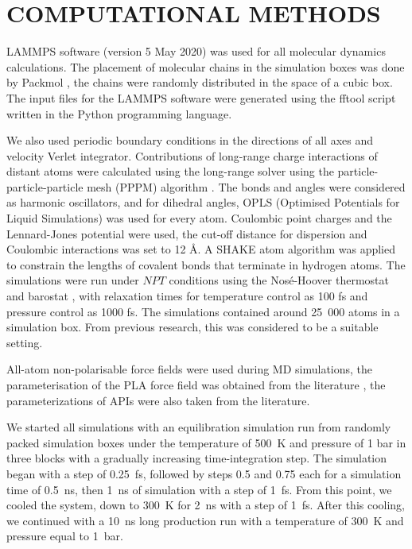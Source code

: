 \newpage
\section{COMPUTATIONAL METHODS}


LAMMPS software \cite{thompson_lammps_2022} (version 5 May 2020) was used for all molecular dynamics calculations. The placement of molecular chains in the simulation boxes was done by Packmol \cite{martinez_p_2009}, the chains were randomly distributed in the space of a cubic box. The input files for the LAMMPS software were generated using the fftool \cite{fftool} script written in the Python programming language.

We also used periodic boundary conditions in the directions of all axes and velocity Verlet integrator. Contributions of long-range charge interactions of distant atoms were calculated using the long-range solver using the particle-particle-particle mesh (PPPM) algorithm \cite{hockney_computer_2021}. The bonds and angles were considered as harmonic oscillators, and for dihedral angles, OPLS (Optimised Potentials for Liquid Simulations) was used for every atom.  Coulombic point charges and the Lennard-Jones potential were used, the cut-off distance for dispersion and Coulombic interactions was set to 12 \r{A}. A SHAKE atom algorithm \cite{ryckaert_numerical_1977} was applied to constrain the lengths of covalent bonds that terminate in hydrogen atoms. The simulations were run under $NPT$ conditions using the Nosé-Hoover thermostat and barostat \cite{tuckerman_liouville-operator_2006}, with relaxation times for temperature control as 100 fs and pressure control as 1000 fs. The simulations contained around 25~000 atoms in a simulation box. From previous research, this was considered to be a suitable setting. \cite{klajmon_glass_2023}

All-atom non-polarisable force fields were used during MD simulations, the parameterisation of the PLA force field was obtained from the literature \cite{mcaliley_development_2011}, the parameterizations of APIs were also taken from the literature. \cite{cervinka_structure_2021}

We started all simulations with an equilibration simulation run from randomly packed simulation boxes under the temperature of 500~K and pressure of 1 bar in three blocks with a gradually increasing time-integration step. The simulation began with a step of 0.25~fs, followed by steps 0.5 and 0.75 each for a simulation time of 0.5~ns, then 1~ns of simulation with a step of 1~fs. From this point, we cooled the system, down to 300~K for 2~ns with a step of 1~fs. After this cooling, we continued with a 10~ns long production run with a temperature of 300~K and pressure equal to 1~bar.

